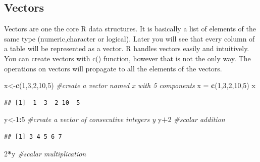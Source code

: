 \documentclass[12pt,]{krantz}
\newenvironment{Shaded}{\begin{snugshade}}{\end{snugshade}}
\newcommand{\CommentTok}[1]{\textcolor[rgb]{0.56,0.35,0.01}{\textit{#1}}}
\newcommand{\DecValTok}[1]{\textcolor[rgb]{0.00,0.00,0.81}{#1}}
\newcommand{\KeywordTok}[1]{\textcolor[rgb]{0.13,0.29,0.53}{\textbf{#1}}}
\newcommand{\NormalTok}[1]{#1}
\newcommand{\OperatorTok}[1]{\textcolor[rgb]{0.81,0.36,0.00}{\textbf{#1}}}
\newcommand{\StringTok}[1]{\textcolor[rgb]{0.31,0.60,0.02}{#1}}
\theoremstyle{definition}
\theoremstyle{definition}
\theoremstyle{definition}
\theoremstyle{remark}
\begin{document}
\hypertarget{vectors}{%
\subsection{Vectors}\label{vectors}}

Vectors are one the core R data structures. It is basically a list of
elements of the same type (numeric,character or logical). Later you will
see that every column of a table will be represented as a vector. R
handles vectors easily and intuitively. You can create vectors with c()
function, however that is not the only way. The operations on vectors
will propagate to all the elements of the vectors.

\begin{Shaded}
\begin{Highlighting}[]
\NormalTok{x<-}\KeywordTok{c}\NormalTok{(}\DecValTok{1}\NormalTok{,}\DecValTok{3}\NormalTok{,}\DecValTok{2}\NormalTok{,}\DecValTok{10}\NormalTok{,}\DecValTok{5}\NormalTok{)    }\CommentTok{#create a vector named x with 5 components}
\NormalTok{x =}\StringTok{ }\KeywordTok{c}\NormalTok{(}\DecValTok{1}\NormalTok{,}\DecValTok{3}\NormalTok{,}\DecValTok{2}\NormalTok{,}\DecValTok{10}\NormalTok{,}\DecValTok{5}\NormalTok{)  }
\NormalTok{x}
\end{Highlighting}
\end{Shaded}

\begin{verbatim}
## [1]  1  3  2 10  5
\end{verbatim}

\begin{Shaded}
\begin{Highlighting}[]
\NormalTok{y<-}\DecValTok{1}\OperatorTok{:}\DecValTok{5}              \CommentTok{#create a vector of consecutive integers y}
\NormalTok{y}\OperatorTok{+}\DecValTok{2}                 \CommentTok{#scalar addition}
\end{Highlighting}
\end{Shaded}

\begin{verbatim}
## [1] 3 4 5 6 7
\end{verbatim}

\begin{Shaded}
\begin{Highlighting}[]
\DecValTok{2}\OperatorTok{*}\NormalTok{y                 }\CommentTok{#scalar multiplication}
\end{Highlighting}
\end{Shaded}
\end{document}
